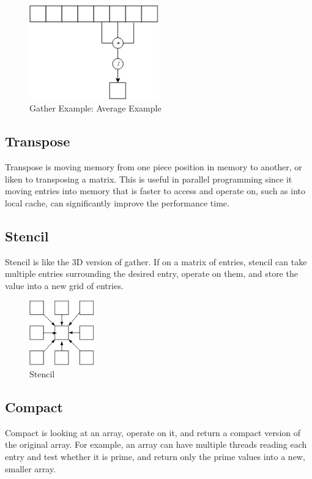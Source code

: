 \documentclass[twoside]{article}
\begin{document}
\begin{figure}[ht]
  \centering
  \includegraphics[width=0.50\textwidth]{./GatherAverage.png} 
  \caption{Gather Example: Average Example}
  \label{fig:gather}
\end{figure}

\subsection{Transpose}
Transpose is moving memory from one piece position in memory to another, or liken to transposing a matrix. This is useful in parallel programming since it moving entries into memory that is faster to access and operate on, such as into local cache, can significantly improve the performance time.

\subsection{Stencil}
Stencil is like the 3D version of gather. If on a matrix of entries, stencil can take multiple entries surrounding the desired entry, operate on them, and store the value into a new grid of entries. 

\begin{figure}[ht]
  \centering
  \includegraphics[width=0.25\textwidth]{./Stencil.png} 
  \caption{Stencil}
  \label{fig:stencil}
\end{figure}

\subsection{Compact}
Compact is looking at an array, operate on it, and return a compact version of the original array. For example, an array can have multiple threads reading each entry and test whether it is prime, and return only the prime values into a new, smaller array. 
\end{document}
